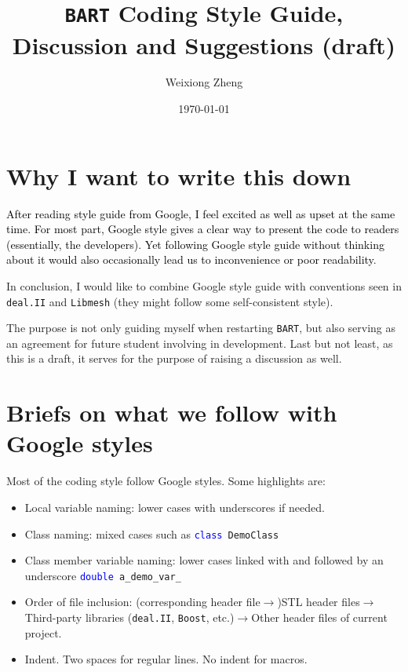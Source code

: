 \documentclass{article}
\title{{\tt BART} Coding Style Guide, Discussion and Suggestions (draft)} %
\author{Weixiong Zheng} %
\date{\today} %
\newcommand{\blue}[1]{\textcolor{blue}{#1}}
\begin{document}
\maketitle %
\section{Why I want to write this down}
\textcolor{black}{After reading style guide from Google, I feel excited as well as upset at the same time. For most part, Google style gives a clear way to present the code to readers (essentially, the developers). Yet following Google style guide without thinking about it would also occasionally lead us to inconvenience or poor readability}.

In conclusion, I would like to combine Google style guide with conventions seen in {\tt deal.II} and {\tt Libmesh} (they might follow some self-consistent style).

The purpose is not only guiding myself when restarting {\tt BART}, but also serving as an agreement for future student involving in development. Last but not least, as this is a draft, it serves for the purpose of raising a discussion as well.
\section{Briefs on what we follow with Google styles}
Most of the coding style follow Google styles. Some highlights are:
\begin{itemize}
	\item Local variable naming: lower cases with underscores if needed.
	\item Class naming: mixed cases such as {\tt \blue{class} DemoClass}
	\item Class member variable naming: lower cases linked with and followed by an underscore {\tt \blue{double} a\_demo\_var\_}
	\item Order of file inclusion: (corresponding header file$\rightarrow$)STL header files$\rightarrow$Third-party libraries ({\tt deal.II}, {\tt Boost}, etc.)$\rightarrow$Other header files of current project.
	\item Indent. Two spaces for regular lines. No indent for macros.
\end{itemize}
\end{document}
